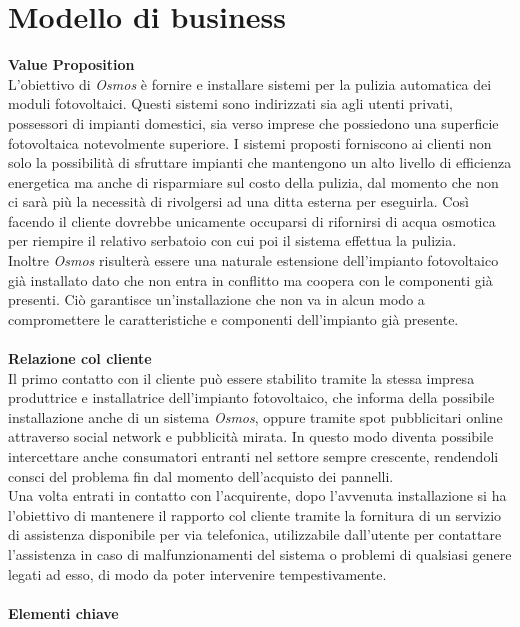 \documentclass[a4paper, 12pt]{article}
\begin{document}
	\section{Modello di business}
	\textbf{Value Proposition}\\
	L'obiettivo di \emph{Osmos} è fornire e installare sistemi per la pulizia automatica dei moduli fotovoltaici. Questi sistemi sono indirizzati sia agli utenti privati, possessori di impianti domestici, sia verso imprese che possiedono una superficie fotovoltaica notevolmente superiore. %
	I sistemi proposti forniscono ai clienti non solo la possibilità di sfruttare impianti che mantengono un alto livello di efficienza energetica ma anche di risparmiare sul costo della pulizia, dal momento che non ci sarà più la necessità di rivolgersi ad una ditta esterna per eseguirla. Così facendo il cliente dovrebbe unicamente occuparsi di rifornirsi di acqua osmotica per riempire il relativo serbatoio con cui poi il sistema effettua la pulizia.\\
	Inoltre \emph{Osmos} risulterà essere una naturale estensione dell'impianto fotovoltaico già installato dato che non entra in conflitto ma coopera con le componenti già presenti. Ciò garantisce un'installazione che non va in alcun modo a compromettere le caratteristiche e componenti dell'impianto già presente.\\\\
	\textbf{Relazione col cliente}\\
	Il primo contatto con il cliente può essere stabilito tramite la stessa impresa produttrice e installatrice dell'impianto fotovoltaico, che informa della possibile installazione anche di un sistema \emph{Osmos}, oppure tramite spot pubblicitari online attraverso social network e pubblicità mirata. In questo modo diventa possibile intercettare anche consumatori entranti nel settore sempre crescente, rendendoli consci del problema fin dal momento dell'acquisto dei pannelli.\\
	Una volta entrati in contatto con l'acquirente, dopo l'avvenuta installazione si ha l'obiettivo di mantenere il rapporto col cliente tramite la fornitura di un servizio di assistenza disponibile per via telefonica, utilizzabile dall'utente per contattare l'assistenza in caso di malfunzionamenti del sistema o problemi di qualsiasi genere legati ad esso, di modo da poter intervenire tempestivamente.\\\\
	\textbf{Elementi chiave}\\
\end{document}
